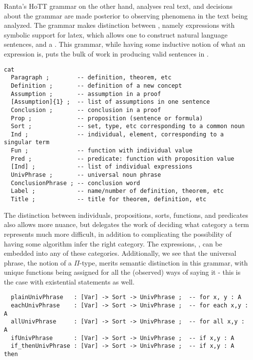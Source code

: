 Ranta's HoTT grammar on the other hand, analyses real text, and decisions about
the grammar are made posterior to observing phenomena in the text being
analyzed. The grammar makes distinction between , namely
expressions with symbolic support for latex,  which allows
one to construct natural language sentences, and a . This
grammar, while having some inductive notion of what an expression is, puts the
bulk of work in producing valid sentences in .

\begin{verbatim}
cat
  Paragraph ;        -- definition, theorem, etc
  Definition ;       -- definition of a new concept
  Assumption ;       -- assumption in a proof  
  [Assumption]{1} ;  -- list of assumptions in one sentence 
  Conclusion ;       -- conclusion in a proof 
  Prop ;             -- proposition (sentence or formula) 
  Sort ;             -- set, type, etc corresponding to a common noun
  Ind ;              -- individual, element, corresponding to a singular term
  Fun ;              -- function with individual value
  Pred ;             -- predicate: function with proposition value 
  [Ind] ;            -- list of individual expressions  
  UnivPhrase ;       -- universal noun phrase          
  ConclusionPhrase ; -- conclusion word               
  Label ;            -- name/number of definition, theorem, etc 
  Title ;            -- title for theorem, definition, etc
\end{verbatim}

The distinction between individuals, propositions, sorts, functions, and
predicates also allows more nuance, but delegates the work of deciding what
category a term represents much more difficult, in addition to complicating the
possibility of having some algorithm infer the right category. The expressions,
, can be embedded into any of these categories. Additionally, we
see that the universal phrase, the notion of a $\Pi$-type, merits semantic
distinction in this grammar, with unique functions being assigned for all the
(observed) ways of saying it - this is the case with existential statements as
well.

\begin{verbatim}
  plainUnivPhrase   : [Var] -> Sort -> UnivPhrase ;  -- for x, y : A
  eachUnivPhrase    : [Var] -> Sort -> UnivPhrase ;  -- for each x,y : A
  allUnivPhrase     : [Var] -> Sort -> UnivPhrase ;  -- for all x,y : A
  ifUnivPhrase      : [Var] -> Sort -> UnivPhrase ;  -- if x,y : A
  if_thenUnivPhrase : [Var] -> Sort -> UnivPhrase ;  -- if x,y : A then
\end{verbatim}

